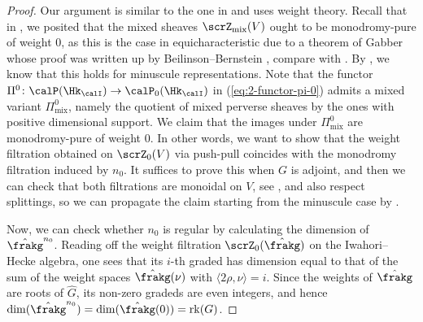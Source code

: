\documentclass[10pt, reqno]{amsart}
\theoremstyle{plain}
\theoremstyle{definition}
\numberwithin{equation}{section}
\begin{document}
\begin{proof}
	Our argument is similar to the one in \cite[Section 6.5.8]{AR} and uses weight theory. Recall that in , we posited that the mixed sheaves $\scrZ_{\mathrm{mix}}(V)$ ought to be monodromy-pure of weight $0$, as this is the case in equicharacteristic due to a theorem of Gabber whose proof was written up by Beilinson--Bernstein \cite{BB93}, compare with \cite[Theorem 5.1.2]{BB93}. By , we know that this holds for minuscule representations. Note that the functor $\Pi^0\colon \calP(\Hk_\calI)\to \calP_0(\Hk_{\calI})$ in (\ref{eq:2-functor-pi-0}) admits a mixed variant $\Pi^0_{\mathrm{mix}}$, namely the quotient of mixed perverse sheaves by the ones with positive dimensional support.  We claim that the images under $\Pi^0_{\mathrm{mix}}$ are monodromy-pure of weight $0$. In other words, we want to show that the weight filtration obtained on $\scrZ_0(V)$ via push-pull coincides with the monodromy filtration induced by $n_0$. It suffices to prove this when $G$ is adjoint, and then we can check that both filtrations are monoidal on $V$, see \cite[Lemma 4.1.2]{BB93}, and also respect splittings, so we can propagate the claim starting from the minuscule case by .
	
	Now, we can check whether $n_0$ is regular by calculating the dimension of $\hat{\frakg}^{n_0}$. Reading off the weight filtration $\scrZ_0(\hat{\frakg})$ on the Iwahori--Hecke algebra, one sees that its $i$-th graded has dimension equal to that of the sum of the weight spaces $\hat{\frakg}(\nu)$ with $\langle 2\rho,\nu\rangle=i$. Since the weights of $\hat{\frakg}$ are roots of $\hat{G}$, its non-zero gradeds are even integers, and hence $\mathrm{dim}(\hat{\frakg}^{n_0}) =\mathrm{dim}(\hat{\frakg}(0))=\mathrm{rk}(G)$.
\end{proof}
\iffalse
\end{document}
